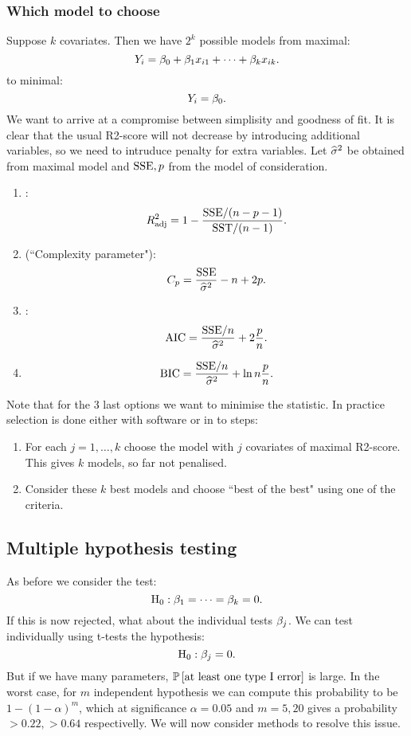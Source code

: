 \subsubsection{Which model to choose}
Suppose $k$ covariates. Then we have $2^k$ possible models from maximal:
$$
    Y_i = \beta_0+\beta_1x_{i1} + \dots + \beta_kx_{ik}.
$$
to minimal:
$$
    Y_i = \beta_0.
$$
We want to arrive at a compromise between simplisity and goodness of fit. It is clear that the usual R2-score will not decrease by introducing additional variables, so we need to intruduce penalty for extra variables. Let $\widehat{\sigma}^2$ be obtained from maximal model and $\mathrm{SSE}, p$ from the model of consideration.
\begin{enumerate}
    \item {}:
    $$
        R^2_{\mathrm{adj}} = 1 - \frac{\mathrm{SSE} / (n-p-1)}{\mathrm{SST} / (n-1)}.
    $$
    \item {} (``Complexity parameter"):
    $$
        C_p = \frac{\mathrm{SSE}}{\widehat{\sigma}^2} - n + 2p.
    $$
    \item {}:
    $$
        \mathrm{AIC} = \frac{\mathrm{SSE}/n}{\widehat{\sigma}^2} + 2\frac{p}{n}.
    $$
    \item {}
    $$
        \mathrm{BIC} = \frac{\mathrm{SSE}/n}{\widehat{\sigma}^2} + \ln{n}\frac{p}{n}.
    $$
\end{enumerate}
Note that for the 3 last options we want to minimise the statistic. In practice selection is done either with software or in to steps:
\begin{enumerate}
    \item For each $j=1,\dots,k$ choose the model with $j$ covariates of maximal R2-score. This gives $k$ models, so far not penalised.
    \item Consider these $k$ best models and choose ``best of the best" using one of the criteria. 
\end{enumerate}


\subsection{Multiple hypothesis testing}
As before we consider the test:
$$
    \mathrm{H}_0 : \beta_1=\dots=\beta_k = 0.
$$
If this is now rejected, what about the individual tests $\beta_j$. We can test individually using t-tests the hypothesis:
$$
    \mathrm{H}_0 : \beta_j = 0.
$$
But if we have many parameters, $\mathbb{P}\left[\textrm{at least one type I error}\right]$ is large. In the worst case, for $m$ independent hypothesis we can compute this probability to be $1-(1-\alpha)^m$, which at significance $\alpha=0.05$ and $m=5, 20$ gives a probability $>0.22, >0.64$ respectivelly. We will now consider methods to resolve this issue. 

